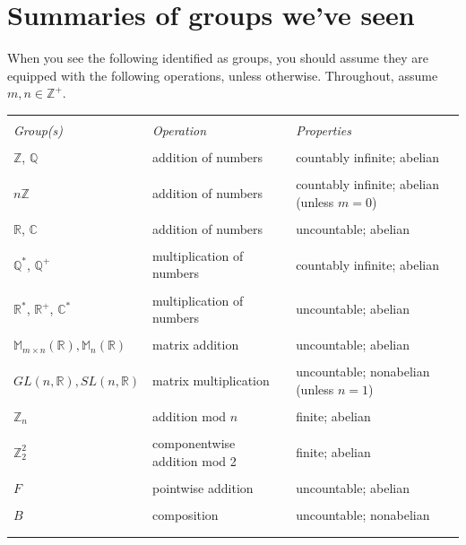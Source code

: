 \documentclass[10pt,]{book}
\theoremstyle{plain}
\theoremstyle{definition}
\theoremstyle{definition}
\theoremstyle{definition}
\theoremstyle{definition}
\numberwithin{equation}{section}
\newcommand{\hrulethin}  {\noalign{\hrule height 0.04em}}
\def\Z{\mathbb{Z}}
\def\R{\mathbb{R}}
\def\Q{\mathbb{Q}}
\def\C{\mathbb{C}}
\def\M{\mathbb{M}}
\begin{document}
\section[{Summaries of groups we've seen}]{Summaries of groups we've seen}\label{section-9}
When you see the following identified as groups, you should assume they are equipped with the following operations, unless otherwise. Throughout, assume \(m,n\in \Z^+\).%
\begin{tabular}{lll}
&&\tabularnewline\hrulethin
\emph{Group(s)}&\emph{Operation}&\emph{Properties}\tabularnewline[0pt]
&&\tabularnewline\hrulethin
\(\Z\), \(\Q\)&addition of numbers&countably infinite; abelian\tabularnewline[0pt]
&&\tabularnewline\hrulethin
\(n\Z\)&addition of numbers&countably infinite; abelian (unless \(m=0\))\tabularnewline[0pt]
&&\tabularnewline\hrulethin
\(\R\), \(\C\)&addition of numbers&uncountable; abelian\tabularnewline[0pt]
&&\tabularnewline\hrulethin
\(\Q^*\), \(\Q^+\)&multiplication of  numbers&countably infinite; abelian\tabularnewline[0pt]
&&\tabularnewline\hrulethin
\(\R^*\), \(\R^+\), \(\C^*\)&multiplication of  numbers&uncountable; abelian\tabularnewline[0pt]
&&\tabularnewline\hrulethin
\(\M_{m\times n}(\R), \M_n(\R)\)&matrix addition&uncountable; abelian\tabularnewline[0pt]
&&\tabularnewline\hrulethin
\(GL(n,\R), SL(n,\R)\)&matrix multiplication&uncountable; nonabelian (unless \(n=1\))\tabularnewline[0pt]
&&\tabularnewline\hrulethin
\(\Z_n\)&addition mod \(n\)&finite; abelian\tabularnewline[0pt]
&&\tabularnewline\hrulethin
\(\Z_2^2\)&componentwise addition mod 2&finite; abelian\tabularnewline[0pt]
&&\tabularnewline\hrulethin
\(F\)&pointwise addition&uncountable; abelian\tabularnewline[0pt]
&&\tabularnewline\hrulethin
\(B\)&composition&uncountable; nonabelian\tabularnewline[0pt]
&&\tabularnewline\hrulethin
\end{tabular}
\typeout{************************************************}
\typeout{************************************************}
\end{document}
